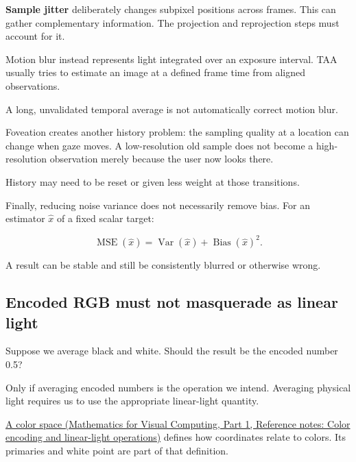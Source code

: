 \hypertarget{04-visual-computing-ii-ch043-jitter-taa-and-motion-blur-solve-different-problems}{}

\textbf{Sample jitter} deliberately changes subpixel positions across frames. This can gather complementary information. The projection and reprojection steps must account for it.

Motion blur instead represents light integrated over an exposure interval. TAA usually tries to estimate an image at a defined frame time from aligned observations.

A long, unvalidated temporal average is not automatically correct motion blur.

Foveation creates another history problem: the sampling quality at a location can change when gaze moves. A low-resolution old sample does not become a high-resolution observation merely because the user now looks there.

History may need to be reset or given less weight at those transitions.

Finally, reducing noise variance does not necessarily remove bias. For an estimator \(\hat x\) of a fixed scalar target:

\[
\operatorname{MSE}(\hat x)
=\operatorname{Var}(\hat x)+\operatorname{Bias}(\hat x)^2.
\]

A result can be stable and still be consistently blurred or otherwise wrong.

\subsection{Encoded RGB must not masquerade as linear light}\label{04-visual-computing-ii-ch043-encoded-rgb-must-not-masquerade-as-linear-light}

\hypertarget{04-visual-computing-ii-ch043-encoded-rgb-must-not-masquerade-as-linear-light}{}

Suppose we average black and white. Should the result be the encoded number 0.5?

Only if averaging encoded numbers is the operation we intend. Averaging physical light requires us to use the appropriate linear-light quantity.

\href{../02-Mathematics-for-Visual-Computing-P01/main.pdf\#nameddest=appendix-a9f83ad40792}{A color space (Mathematics for Visual Computing, Part 1, Reference notes: Color encoding and linear-light operations)} defines how coordinates relate to colors. Its primaries and white point are part of that definition.

